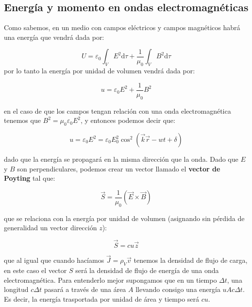 \documentclass[12pt]{article}
\newcommand{\D}{\mathrm{d}}
\begin{document}
\subsection{Energía y momento en ondas electromagnéticas}

Como sabemos, en un medio con campos eléctricos y campos magnéticos habrá una energía que vendrá dada por:

$$
U = \varepsilon_0 \int_V E^2 \D \tau +   \dfrac{1}{\mu_0} \int_V B^2 \D \tau
$$
por lo tanto la energía por unidad de volumen vendrá dada por: 

\begin{equation}
u = \varepsilon_0 E^2 + \dfrac{1}{\mu_0} B^2
\end{equation}

en el caso de que los campos tengan relación con una onda electromagnética tenemos que $B^2 = \mu_0 \varepsilon_0 E^2$, y entonces podemos decir que:

\begin{equation}
u = \varepsilon_0 E^2 = \varepsilon_0 E_0^2 \cos^2 (\vec{k} \vec{r} - wt + \delta)
\end{equation}

dado que la energía se propagará en la misma dirección que la onda. Dado que $E$ y $B$ son perpendiculares, podemos crear un vector llamado el \textbf{vector de Poyting} tal que:

\begin{equation}
\vec{S} = \dfrac{1}{\mu_0} (\vec{E} \times \vec{B})
\end{equation}

que se relaciona con la energía por unidad de volumen (asignando sin pérdida de generalidad un vector dirección $z$):

\begin{equation}
\vec{S} = c u \vec{z}
\end{equation}

que al igual que cuando hacíamos $\vec{J}=\rho_V \vec{v}$ tenemos la densidad de flujo de carga, en este caso el vector $S$ será la densidad de flujo de energía de una onda electromagnética. Para entenderlo mejor supongamos que en un tiempo $\Delta t$, una longitud $c \Delta t$ pasará a través de una área $A$ llevando consigo una energía $u A c \Delta t$. Es decir, la energía trasportada por unidad de área y tiempo será $c u$.\\
\end{document}
